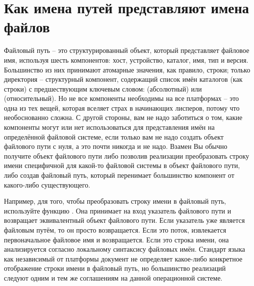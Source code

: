 
\section{Как имена путей представляют имена файлов}

Файловый путь -- это структурированный объект, который представляет файловое имя,
используя шесть компонентов: хост, устройство, каталог, имя, тип и версия. Большинство из
них принимают атомарные значения, как правило, строки; только директория -- структурный
компонент, содержащий список имён каталогов (как строки) с предшествующим ключевым словом:
 (абсолютный) или  (относительный). Но не все компоненты
необходимы на все платформах -- это одна из тех вещей, которая вселяет страх в начинающих
лисперов, потому что необоснованно сложна. С другой стороны, вам не надо заботиться о том,
какие компоненты могут или нет использоваться для представления имён на определённой
файловой системе, если только вам не надо создать объект файлового пути с нуля, а это
почти никогда и не надо. Взамен Вы обычно получите объект файлового пути либо позволив
реализации преобразовать строку имени специфичной для какой-то файловой системы в объект
файлового пути, либо создав файловый путь, который перенимает большинство компонент от
какого-либо существующего.

Например, для того, чтобы преобразовать строку имени в файловый путь, используйте функцию
. Она принимает на вход указатель файлового пути и возвращает эквивалентный
объект файлового пути. Если указатель уже является файловым путём, то он просто
возвращается. Если это поток, извлекается первоначальное файловое имя и возвращается. Если
это строка имени, она анализируется согласно локальному синтаксису файловых имён. Стандарт
языка как независимый от платформы документ не определяет какое-либо конкретное
отображение строки имени в файловый путь, но большинство реализаций следуют одним и тем же
соглашениям на данной операционной системе.

